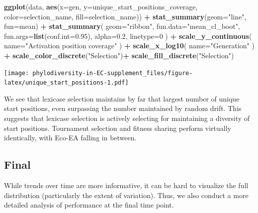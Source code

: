 \documentclass[]{book}
\newenvironment{Shaded}{\begin{snugshade}}{\end{snugshade}}
\newcommand{\DataTypeTok}[1]{\textcolor[rgb]{0.13,0.29,0.53}{#1}}
\newcommand{\DecValTok}[1]{\textcolor[rgb]{0.00,0.00,0.81}{#1}}
\newcommand{\FloatTok}[1]{\textcolor[rgb]{0.00,0.00,0.81}{#1}}
\newcommand{\KeywordTok}[1]{\textcolor[rgb]{0.13,0.29,0.53}{\textbf{#1}}}
\newcommand{\NormalTok}[1]{#1}
\newcommand{\OperatorTok}[1]{\textcolor[rgb]{0.81,0.36,0.00}{\textbf{#1}}}
\newcommand{\StringTok}[1]{\textcolor[rgb]{0.31,0.60,0.02}{#1}}
\begin{document}
\begin{Shaded}
\begin{Highlighting}[]
\KeywordTok{ggplot}\NormalTok{(data, }\KeywordTok{aes}\NormalTok{(}\DataTypeTok{x=}\NormalTok{gen, }\DataTypeTok{y=}\NormalTok{unique_start_positions_coverage, }\DataTypeTok{color=}\NormalTok{selection_name, }\DataTypeTok{fill=}\NormalTok{selection_name)) }\OperatorTok{+}
\StringTok{  }\KeywordTok{stat_summary}\NormalTok{(}\DataTypeTok{geom=}\StringTok{"line"}\NormalTok{, }\DataTypeTok{fun=}\NormalTok{mean) }\OperatorTok{+}
\StringTok{  }\KeywordTok{stat_summary}\NormalTok{(}
    \DataTypeTok{geom=}\StringTok{"ribbon"}\NormalTok{,}
    \DataTypeTok{fun.data=}\StringTok{"mean_cl_boot"}\NormalTok{,}
    \DataTypeTok{fun.args=}\KeywordTok{list}\NormalTok{(}\DataTypeTok{conf.int=}\FloatTok{0.95}\NormalTok{),}
    \DataTypeTok{alpha=}\FloatTok{0.2}\NormalTok{,}
    \DataTypeTok{linetype=}\DecValTok{0}
\NormalTok{  ) }\OperatorTok{+}
\StringTok{  }\KeywordTok{scale_y_continuous}\NormalTok{(}
    \DataTypeTok{name=}\StringTok{"Activation position coverage"}
\NormalTok{  ) }\OperatorTok{+}
\StringTok{  }\KeywordTok{scale_x_log10}\NormalTok{(}
    \DataTypeTok{name=}\StringTok{"Generation"}
\NormalTok{  ) }\OperatorTok{+}
\StringTok{  }\KeywordTok{scale_color_discrete}\NormalTok{(}\StringTok{"Selection"}\NormalTok{)}\OperatorTok{+}
\StringTok{  }\KeywordTok{scale_fill_discrete}\NormalTok{(}\StringTok{"Selection"}\NormalTok{)}
\end{Highlighting}
\end{Shaded}

\texttt{[image: phylodiversity-in-EC-supplement\_files/figure-latex/unique\_start\_positions-1.pdf]}

We see that lexicase selection maintains by far that largest number of unique start positions, even surpassing the number maintained by random drift. This suggests that lexicase selection is actively selecting for maintaining a diversity of start positions. Tournament selection and fitness sharing perform virtually identically, with Eco-EA falling in between.

\hypertarget{final}{%
\subsection{Final}\label{final}}

While trends over time are more informative, it can be hard to visualize the full distribution (particularly the extent of variation). Thus, we also conduct a more detailed analysis of performance at the final time point.
\end{document}
